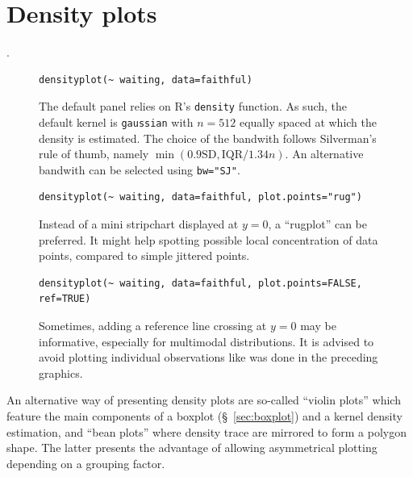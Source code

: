 \documentclass[a4paper,twoside]{book}
\newcounter{fig}
\newcommand{\img}[1]{\texttt{[image: \#1]}\stepcounter{fig}}
\renewcommand{\texttt}[1]{\lstinline{#1}}
\newcommand{\R}{\textsf{R}\xspace}
\begin{document}
\section{Density plots}
\lipsum[1]\autocite{silverman86}.

\begin{figure}[H]
\begin{lstlisting}
densityplot(~ waiting, data=faithful)
\end{lstlisting}
  \fcapside[\FBwidth] {\img{figs_lattice-crop}} {\caption*{The default
      panel relies on \R's \texttt{density} function. As such, the
      default kernel is \texttt{gaussian} with $n=512$ equally spaced
      at which the density is estimated. The choice of the bandwith
      follows Silverman's rule of thumb, namely
      $\min(0.9\textrm{SD},\textrm{IQR}/1.34n)$. An alternative
      bandwith can be selected using \texttt{bw="SJ"}.}}
\end{figure}

\begin{figure}[H]
\begin{lstlisting}
densityplot(~ waiting, data=faithful, plot.points="rug")
\end{lstlisting}
  \fcapside[\FBwidth] {\img{figs_lattice-crop}} {\caption*{Instead of
      a mini stripchart displayed at $y=0$, a ``rugplot'' can be
      preferred. It might help spotting possible local concentration
      of data points, compared to simple jittered points.}}
\end{figure}

\begin{figure}[H]
\begin{lstlisting}
densityplot(~ waiting, data=faithful, plot.points=FALSE, ref=TRUE)
\end{lstlisting}
  \fcapside[\FBwidth] {\img{figs_lattice-crop}} {\caption*{Sometimes,
      adding a reference line crossing at $y=0$ may be informative,
      especially for multimodal distributions. It is advised to avoid
      plotting individual observations like was done in the preceding
      graphics.}}
\end{figure}

An alternative way of presenting density plots are so-called
``violin plots''\autocite{hintze98} which feature the main components
of a boxplot (\S~\ref{sec:boxplot}) and a kernel density estimation,
and ``bean plots''\autocite{kampstra08} where density trace are
mirrored to form a polygon shape. The latter presents the advantage of
allowing asymmetrical plotting depending on a grouping factor.
\end{document}
